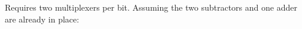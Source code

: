 \documentclass[twocolumn,english]{article}
\begin{document}
Requires two multiplexers per bit. Assuming the two subtractors and
one adder are already in place:

\begin{table}[H]
\noindent \begin{minipage}[t]{0.25\textwidth}

\noindent \begin{centering}
\par\end{centering}

\noindent \end{minipage}
\begin{minipage}[t]{0.25\textwidth}


\end{minipage}
\end{table}
\end{document}
